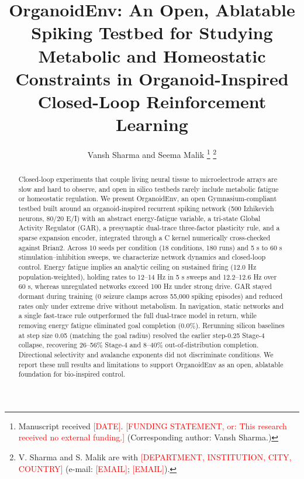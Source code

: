 \documentclass[journal]{IEEEtran}
\begin{document}
\title{OrganoidEnv: An Open, Ablatable Spiking Testbed for Studying Metabolic and Homeostatic Constraints in Organoid-Inspired Closed-Loop Reinforcement Learning}

\author{Vansh Sharma and Seema Malik%
\thanks{Manuscript received \textcolor{red}{[DATE]}. \textcolor{red}{[FUNDING STATEMENT, or: This research received no external funding.]} (Corresponding author: Vansh Sharma.)}%
\thanks{V. Sharma and S. Malik are with \textcolor{red}{[DEPARTMENT, INSTITUTION, CITY, COUNTRY]} (e-mail: \textcolor{red}{[EMAIL]}; \textcolor{red}{[EMAIL]}).}}

\maketitle

\begin{abstract}
Closed-loop experiments that couple living neural tissue to microelectrode arrays are slow and hard to observe, and open in silico testbeds rarely include metabolic fatigue or homeostatic regulation. We present OrganoidEnv, an open Gymnasium-compliant testbed built around an organoid-inspired recurrent spiking network (500 Izhikevich neurons, 80/20 E/I) with an abstract energy-fatigue variable, a tri-state Global Activity Regulator (GAR), a presynaptic dual-trace three-factor plasticity rule, and a sparse expansion encoder, integrated through a C kernel numerically cross-checked against Brian2. Across 10 seeds per condition (18 conditions, 180 runs) and 5 s to 60 s stimulation--inhibition sweeps, we characterize network dynamics and closed-loop control. Energy fatigue implies an analytic ceiling on sustained firing (12.0 Hz population-weighted), holding rates to 12--14 Hz in 5 s sweeps and 12.2--12.6 Hz over 60 s, whereas unregulated networks exceed 100 Hz under strong drive. GAR stayed dormant during training (0 seizure clamps across 55,000 spiking episodes) and reduced rates only under extreme drive without metabolism. In navigation, static networks and a single fast-trace rule outperformed the full dual-trace model in return, while removing energy fatigue eliminated goal completion (0.0\%). Rerunning silicon baselines at step size 0.05 (matching the goal radius) resolved the earlier step-0.25 Stage-4 collapse, recovering 26--56\% Stage-4 and 8--40\% out-of-distribution completion. Directional selectivity and avalanche exponents did not discriminate conditions. We report these null results and limitations to support OrganoidEnv as an open, ablatable foundation for bio-inspired control.
\end{abstract}
\end{document}
